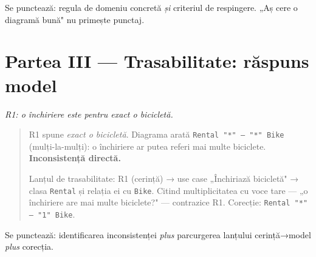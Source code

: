 \documentclass[12pt,a4paper]{article}
\begin{document}
Se punctează: regula de domeniu concretă \emph{și} criteriul de
respingere. „Aș cere o diagramă bună" nu primește punctaj.

\section*{Partea III — Trasabilitate: răspuns model}

\textit{R1: o închiriere este pentru exact o bicicletă.}

\begin{quote}
R1 spune \emph{exact o bicicletă}. Diagrama arată
\texttt{Rental "*" -- "*" Bike} (mulți-la-mulți): o închiriere ar putea
referi mai multe biciclete. \textbf{Inconsistență directă.}

Lanțul de trasabilitate: R1 (cerință) → use case „Închiriază
bicicletă" → clasa \texttt{Rental} și relația ei cu \texttt{Bike}.
Citind multiplicitatea cu voce tare — „o închiriere are mai multe
biciclete?" — contrazice R1. Corecție: \texttt{Rental "*" -- "1" Bike}.
\end{quote}

Se punctează: identificarea inconsistenței \emph{plus} parcurgerea
lanțului cerință→model \emph{plus} corecția.
\end{document}
